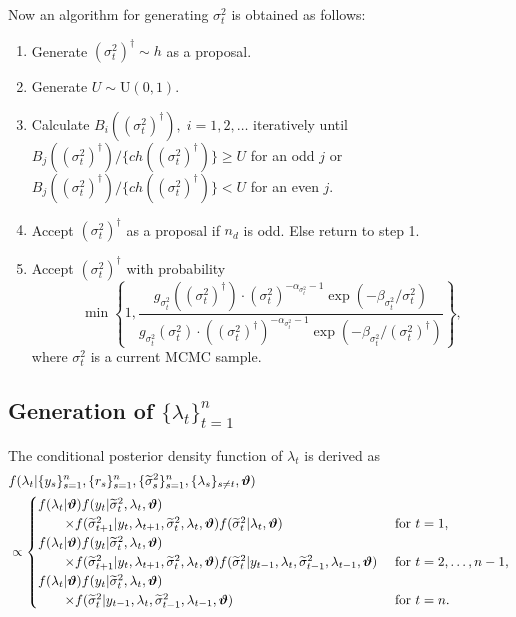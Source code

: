 \documentclass[11pt]{article}
\begin{document}
Now an algorithm for generating $\sigma^2_t$ is obtained as follows: 
\begin{enumerate}
\item 
Generate $(\sigma^2_t)^\dagger \sim h$ as a proposal.
\item 
Generate $U \sim \mathrm{U}(0,1)$.
\item 
Calculate $B_i((\sigma^2_t)^\dagger), \; i=1, 2, \ldots$ iteratively until $B_j((\sigma^2_t)^\dagger)/\{ch((\sigma^2_t)^\dagger)\}\ge U$ for an odd $j$ or $B_j((\sigma^2_t)^\dagger)/\{ch((\sigma^2_t)^\dagger)\}< U$ for an even $j$.
\item 
Accept $(\sigma^2_t)^\dagger$ as a proposal if $n_d$ is odd. Else return to step 1.
\item 
Accept $(\sigma^2_t)^\dagger$ with probability 
\begin{equation}
\min\left\{ 1, \frac{g_{\sigma^2_t}((\sigma^2_t)^\dagger) \cdot (\sigma^2_t)^{-\alpha_{\sigma^2_t}-1}\exp(-\beta_{\sigma^2_t}/\sigma^2_t)}{g_{\sigma^2_t}(\sigma^2_t) \cdot ((\sigma^2_t)^\dagger)^{-\alpha_{\sigma^2_t}-1}\exp(-\beta_{\sigma^2_t}/(\sigma^2_t)^\dagger)} \right\},
\end{equation}
where $\sigma^2_t$ is a current MCMC sample. 
\end{enumerate}


\subsection{Generation of $\{\lambda_t\}_{t=1}^n$}
The conditional posterior density function of $\lambda_t$ is derived as
\begin{align}
&f(\lambda_{t} |\{y_s\}_{s=1}^n, \{r_s\}_{s=1}^n, \{\widetilde{\sigma}^2_{s}\}_{s=1}^n, \{\lambda_s\}_{s\neq t}, \bm{\vartheta}) \notag \\
&\propto \begin{cases}
f(\lambda_t|\bm{\vartheta}) f(y_t |\widetilde{\sigma}^2_{t}, \lambda_t, \bm{\vartheta}) \\
\hspace{20pt} \times 
f(\widetilde{\sigma}^2_{t+1} |y_t, \lambda_{t+1}, \widetilde{\sigma}^2_{t}, \lambda_t, \bm{\vartheta}) f(\widetilde{\sigma}^2_{t} |\lambda_t, \bm{\vartheta}) 
& \text{ for } t=1, \\
f(\lambda_t|\bm{\vartheta}) f(y_t |\widetilde{\sigma}^2_{t}, \lambda_t, \bm{\vartheta}) \\
\hspace{20pt} \times f(\widetilde{\sigma}^2_{t+1} |y_t, \lambda_{t+1}, \widetilde{\sigma}^2_{t}, \lambda_t, \bm{\vartheta}) f(\widetilde{\sigma}^2_{t} |y_{t-1}, \lambda_t, \widetilde{\sigma}^2_{t-1}, \lambda_{t-1}, \bm{\vartheta}) 
& \text{ for } t=2, \ldots, n-1, \\
f(\lambda_t|\bm{\vartheta}) f(y_t |\widetilde{\sigma}^2_{t}, \lambda_t, \bm{\vartheta}) \\
\hspace{20pt} \times f(\widetilde{\sigma}^2_{t} |y_{t-1}, \lambda_{t}, \widetilde{\sigma}^2_{t-1}, \lambda_{t-1}, \bm{\vartheta}) 
& \text{ for } t=n. \end{cases}
\end{align}
\end{document}
